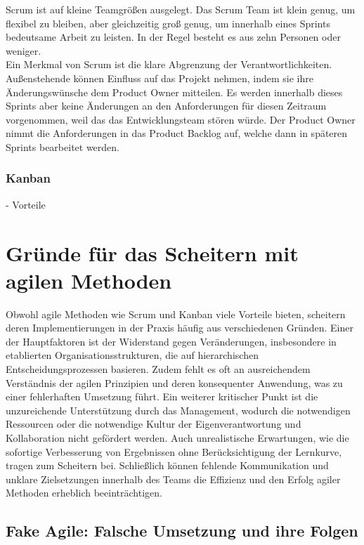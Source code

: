 \documentclass[ngerman]{seminarvorlage}
\begin{document}
Scrum ist auf kleine Teamgrößen ausgelegt. Das Scrum Team ist klein genug, um flexibel zu bleiben, aber gleichzeitig groß genug, um innerhalb eines Sprints bedeutsame Arbeit zu leisten. In der Regel besteht es aus zehn Personen oder weniger.\cite{Mucke.2024}\\
Ein Merkmal von Scrum ist die klare Abgrenzung der Verantwortlichkeiten. Außenstehende können Einfluss auf das Projekt nehmen, indem sie ihre Änderungswünsche dem Product Owner mitteilen. Es werden innerhalb dieses Sprints aber keine Änderungen an den Anforderungen für diesen Zeitraum vorgenommen, weil das das Entwicklungsteam stören würde. Der Product Owner nimmt die Anforderungen in das Product Backlog auf, welche dann in späteren Sprints bearbeitet werden.\cite{Gluck.2022}


\subsubsection{Kanban}
- Vorteile

\section{Gründe für das Scheitern mit agilen Methoden}

Obwohl agile Methoden wie Scrum und Kanban viele Vorteile bieten, scheitern deren Implementierungen in der Praxis häufig aus verschiedenen Gründen. 
Einer der Hauptfaktoren ist der Widerstand gegen Veränderungen, insbesondere in etablierten Organisationsstrukturen, die auf hierarchischen Entscheidungsprozessen basieren. 
Zudem fehlt es oft an ausreichendem Verständnis der agilen Prinzipien und deren konsequenter Anwendung, was zu einer fehlerhaften Umsetzung führt. 
Ein weiterer kritischer Punkt ist die unzureichende Unterstützung durch das Management, wodurch die notwendigen Ressourcen oder die notwendige Kultur der Eigenverantwortung und Kollaboration nicht gefördert werden. 
Auch unrealistische Erwartungen, wie die sofortige Verbesserung von Ergebnissen ohne Berücksichtigung der Lernkurve, tragen zum Scheitern bei. Schließlich können fehlende Kommunikation und unklare Zielsetzungen innerhalb des Teams die Effizienz und den Erfolg agiler Methoden erheblich beeinträchtigen.

\subsection{Fake Agile: Falsche Umsetzung und ihre Folgen}
\end{document}
